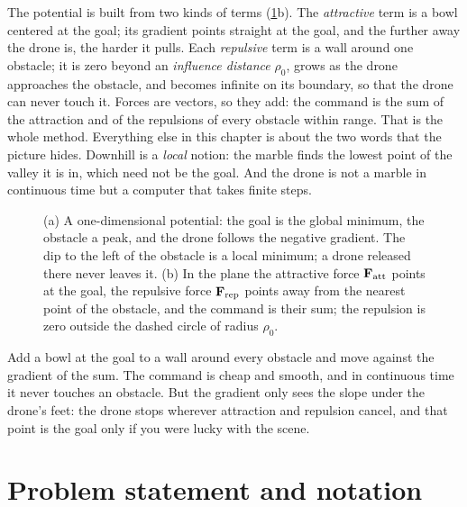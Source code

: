 The potential is built from two kinds of terms (\cref{fig:ch15-idea}b). The
\emph{attractive} term is a bowl centered at the goal; its gradient points
straight at the goal, and the further away the drone is, the harder it pulls.
Each \emph{repulsive} term is a wall around one obstacle; it is zero beyond
an \emph{influence distance} $\rho_0$, grows as the drone approaches the
obstacle, and becomes infinite on its boundary, so that the drone can never
touch it. Forces are vectors, so they add: the command is the sum of the
attraction and of the repulsions of every obstacle within range. That is the
whole method. Everything else in this chapter is about the two words that the
picture hides. Downhill is a \emph{local} notion: the marble finds the lowest
point of the valley it is in, which need not be the goal. And the drone is
not a marble in continuous time but a computer that takes finite steps.

\begin{figure}[tb]
  \centering
  \caption{(a) A one-dimensional potential: the goal is the global minimum,
  the obstacle a peak, and the drone follows the negative gradient. The dip
  to the left of the obstacle is a local minimum; a drone released there
  never leaves it. (b) In the plane the attractive force $\mathbf{F}_{\mathrm{att}}$
  points at the goal, the repulsive force $\mathbf{F}_{\mathrm{rep}}$ points away
  from the nearest point of the obstacle, and the command is their sum; the
  repulsion is zero outside the dashed circle of radius $\rho_0$.}
  \label{fig:ch15-idea}
\end{figure}

\begin{keyidea}
Add a bowl at the goal to a wall around every obstacle and move against the
gradient of the sum. The command is cheap and smooth, and in continuous time
it never touches an obstacle. But the gradient only sees the slope under the
drone's feet: the drone stops wherever attraction and repulsion cancel, and
that point is the goal only if you were lucky with the scene.
\end{keyidea}

\section{Problem statement and notation}
\label{sec:ch15-problem}

